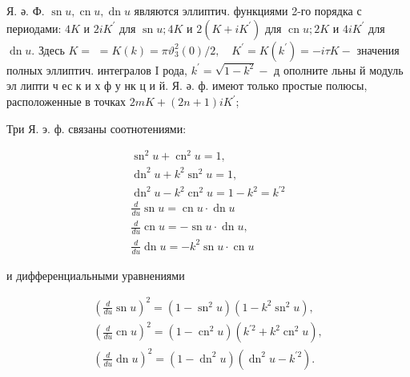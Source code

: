 \documentclass[10pt]{article}
\begin{document}
Я. ә. Ф. $\operatorname{sn} u, \operatorname{cn} u, \operatorname{dn} u$ являются эллиптич. функциями 2-го порядка с периодами: $4 K$ и $2 i K^{\prime}$ для $\operatorname{sn} u ; 4 K$ и $2\left(K+i K^{\prime}\right)$ для $\operatorname{cn} u ; 2 K$ и $4 i K^{\prime}$ для $\operatorname{dn} u$. Здесь $K=$ $=K(k)=\pi \vartheta_{3}^{2}(0) / 2, \quad K^{\prime}=K\left(k^{\prime}\right)=-i \tau K-$ значения полных эллиптич. интегралов I рода, $k^{\prime}=\sqrt{1-k^{2}}-$ д ополните льны й модуль эл липти ч ес к и х ф у нк ц и й. Я. ә. ф. имеют только простые полюсы, расположенные в точках $2 m K+(2 n+1) i K^{\prime}$;



Три Я. э. ф. связаны соотнотениями:



\[

\begin{gathered}

\operatorname{sn}^{2} u+\operatorname{cn}^{2} u=1, \\

\operatorname{dn}^{2} u+k^{2} \operatorname{sn}^{2} u=1, \\

\operatorname{dn}^{2} u-k^{2} \operatorname{cn}^{2} u=1-k^{2}=k^{\prime 2} \\

\frac{d}{d u} \operatorname{sn} u=\operatorname{cn} u \cdot \operatorname{dn} u \\

\frac{d}{d u} \operatorname{cn} u=-\operatorname{sn} u \cdot \operatorname{dn} u, \\

\frac{d}{d u} \operatorname{dn} u=-k^{2} \operatorname{sn} u \cdot \operatorname{cn} u

\end{gathered}

\]



и дифференциальными уравнениями



\[

\begin{gathered}

\left(\frac{d}{d u} \operatorname{sn} u\right)^{2}=\left(1-\operatorname{sn}^{2} u\right)\left(1-k^{2} \operatorname{sn}^{2} u\right), \\

\left(\frac{d}{d u} \operatorname{cn} u\right)^{2}=\left(1-\operatorname{cn}^{2} u\right)\left(k^{\prime 2}+k^{2} \operatorname{cn}^{2} u\right), \\

\left(\frac{d}{d u} \operatorname{dn} u\right)^{2}=\left(1-\operatorname{dn}^{2} u\right)\left(\operatorname{dn}^{2} u-k^{\prime 2}\right) .

\end{gathered}

\]
\end{document}
